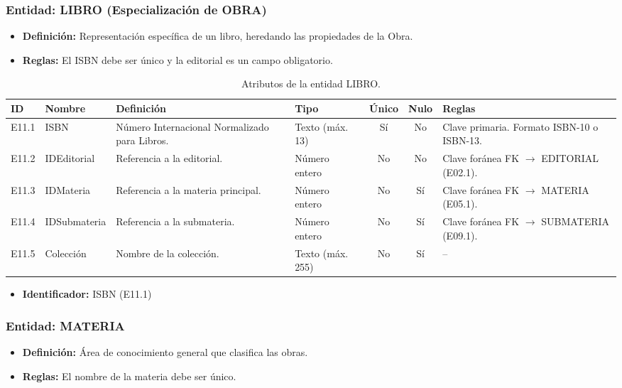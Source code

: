 \subsubsection{Entidad: LIBRO (Especialización de OBRA)}
\begin{itemize}
	\item\textbf{Definición:} Representación específica de un libro, heredando las propiedades de la Obra.
	\item\textbf{Reglas:} El ISBN debe ser único y la editorial es un campo obligatorio.
\end{itemize}

\begin{table}[H]
	\centering
	\caption{Atributos de la entidad LIBRO.}
	\label{tab:dict_libro}
	\small
	\begin{tabularx}{\textwidth}{l l X l c c X}
		\toprule
		\textbf{ID} & \textbf{Nombre} & \textbf{Definición} & \textbf{Tipo} & \textbf{Único} & \textbf{Nulo} & \textbf{Reglas} \\
		\midrule
		E11.1 & ISBN & Número Internacional Normalizado para Libros. & Texto (máx. 13) & Sí & No & Clave primaria. Formato ISBN-10 o ISBN-13. \\
		\addlinespace
		E11.2 & IDEditorial & Referencia a la editorial. & Número entero & No & No & Clave foránea FK $\rightarrow$ EDITORIAL (E02.1). \\
		\addlinespace
		E11.3 & IDMateria & Referencia a la materia principal. & Número entero & No & Sí & Clave foránea FK $\rightarrow$ MATERIA (E05.1). \\
		\addlinespace
		E11.4 & IDSubmateria & Referencia a la submateria. & Número entero & No & Sí & Clave foránea FK $\rightarrow$ SUBMATERIA (E09.1). \\
		\addlinespace
		E11.5 & Colección & Nombre de la colección. & Texto (máx. 255) & No & Sí & -- \\
		\bottomrule
	\end{tabularx}
\end{table}

\begin{itemize}
	\item\textbf{Identificador:} ISBN (E11.1)
\end{itemize}

\subsubsection{Entidad: MATERIA}
\begin{itemize}
	\item\textbf{Definición:} Área de conocimiento general que clasifica las obras.
	\item\textbf{Reglas:} El nombre de la materia debe ser único.
\end{itemize}

